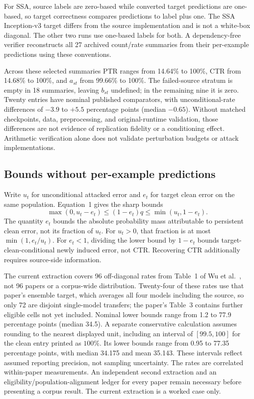 \documentclass[10pt,twocolumn]{article}
\begin{document}
For SSA, source labels are zero-based while converted target predictions are one-based, so target correctness compares predictions to label plus one. The SSA Inception-v3 target differs from the source implementation and is not a white-box diagonal. The other two runs use one-based labels for both. A dependency-free verifier reconstructs all 27 archived count/rate summaries from their per-example predictions using these conventions.

Across these selected summaries PTR ranges from 14.64\% to 100\%, CTR from 14.68\% to 100\%, and $a_{st}$ from 99.66\% to 100\%. The failed-source stratum is empty in 18 summaries, leaving $b_{st}$ undefined; in the remaining nine it is zero. Twenty entries have nominal published comparators, with unconditional-rate differences of $-3.9$ to $+5.5$ percentage points (median $-0.65$). Without matched checkpoints, data, preprocessing, and original-runtime validation, those differences are not evidence of replication fidelity or a conditioning effect. Arithmetic verification alone does not validate perturbation budgets or attack implementations.

\subsection{Bounds without per-example predictions}
Write $u_t$ for unconditional attacked error and $e_t$ for target clean error on the same population. Equation~1 gives the sharp bounds
\begin{equation}
\max(0,u_t-e_t)\leq (1-e_t)q\leq\min(u_t,1-e_t).
\end{equation}
The quantity $e_t$ bounds the absolute probability mass attributable to persistent clean error, not its fraction of $u_t$. For $u_t>0$, that fraction is at most $\min(1,e_t/u_t)$. For $e_t<1$, dividing the lower bound by $1-e_t$ bounds target-clean-conditional newly induced error, not CTR. Recovering CTR additionally requires source-side information.

The current extraction covers 96 off-diagonal rates from Table~1 of Wu et al.\ \cite{wu2020}, not 96 papers or a corpus-wide distribution. Twenty-four of these rates use that paper's ensemble target, which averages all four models including the source, so only 72 are disjoint single-model transfers; the paper's Table~3 contains further eligible cells not yet included. Nominal lower bounds range from 1.2 to 77.9 percentage points (median 34.5). A separate conservative calculation assumes rounding to the nearest displayed unit, including an interval of $[99.5,100]$ for the clean entry printed as $100\%$. Its lower bounds range from 0.95 to 77.35 percentage points, with median 34.175 and mean 35.143. These intervals reflect assumed reporting precision, not sampling uncertainty. The rates are correlated within-paper measurements. An independent second extraction and an eligibility/population-alignment ledger for every paper remain necessary before presenting a corpus result. The current extraction is a worked case only.
\end{document}
